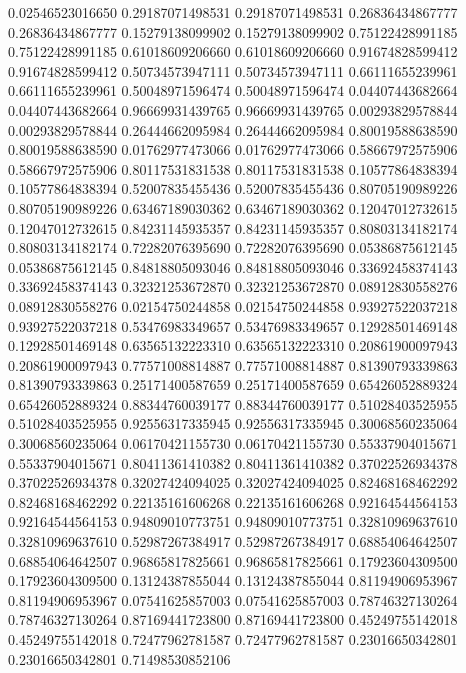    0.02546523016650   0.29187071498531
   0.29187071498531   0.26836434867777
   0.26836434867777   0.15279138099902
   0.15279138099902   0.75122428991185
   0.75122428991185   0.61018609206660
   0.61018609206660   0.91674828599412
   0.91674828599412   0.50734573947111
   0.50734573947111   0.66111655239961
   0.66111655239961   0.50048971596474
   0.50048971596474   0.04407443682664
   0.04407443682664   0.96669931439765
   0.96669931439765   0.00293829578844
   0.00293829578844   0.26444662095984
   0.26444662095984   0.80019588638590
   0.80019588638590   0.01762977473066
   0.01762977473066   0.58667972575906
   0.58667972575906   0.80117531831538
   0.80117531831538   0.10577864838394
   0.10577864838394   0.52007835455436
   0.52007835455436   0.80705190989226
   0.80705190989226   0.63467189030362
   0.63467189030362   0.12047012732615
   0.12047012732615   0.84231145935357
   0.84231145935357   0.80803134182174
   0.80803134182174   0.72282076395690
   0.72282076395690   0.05386875612145
   0.05386875612145   0.84818805093046
   0.84818805093046   0.33692458374143
   0.33692458374143   0.32321253672870
   0.32321253672870   0.08912830558276
   0.08912830558276   0.02154750244858
   0.02154750244858   0.93927522037218
   0.93927522037218   0.53476983349657
   0.53476983349657   0.12928501469148
   0.12928501469148   0.63565132223310
   0.63565132223310   0.20861900097943
   0.20861900097943   0.77571008814887
   0.77571008814887   0.81390793339863
   0.81390793339863   0.25171400587659
   0.25171400587659   0.65426052889324
   0.65426052889324   0.88344760039177
   0.88344760039177   0.51028403525955
   0.51028403525955   0.92556317335945
   0.92556317335945   0.30068560235064
   0.30068560235064   0.06170421155730
   0.06170421155730   0.55337904015671
   0.55337904015671   0.80411361410382
   0.80411361410382   0.37022526934378
   0.37022526934378   0.32027424094025
   0.32027424094025   0.82468168462292
   0.82468168462292   0.22135161606268
   0.22135161606268   0.92164544564153
   0.92164544564153   0.94809010773751
   0.94809010773751   0.32810969637610
   0.32810969637610   0.52987267384917
   0.52987267384917   0.68854064642507
   0.68854064642507   0.96865817825661
   0.96865817825661   0.17923604309500
   0.17923604309500   0.13124387855044
   0.13124387855044   0.81194906953967
   0.81194906953967   0.07541625857003
   0.07541625857003   0.78746327130264
   0.78746327130264   0.87169441723800
   0.87169441723800   0.45249755142018
   0.45249755142018   0.72477962781587
   0.72477962781587   0.23016650342801
   0.23016650342801   0.71498530852106
